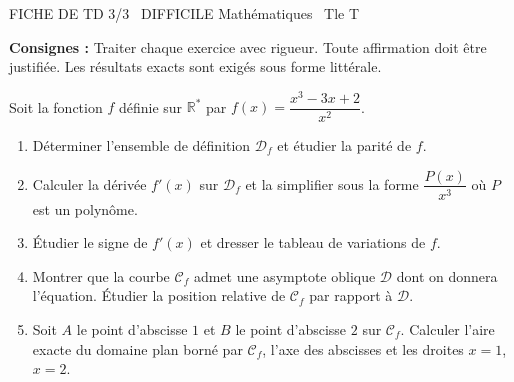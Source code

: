 \documentclass[11pt]{article}
\begin{document}
\begin{tcolorbox}[enhanced,colback=popink,colframe=popink,arc=10pt,boxrule=0pt,left=12pt,right=12pt,top=9pt,bottom=9pt]
{\color{white}\popxbold\small FICHE DE TD 3/3 \textbullet\ DIFFICILE \hfill Mathématiques \textbullet\ Tle T\par}
\end{tcolorbox}
\vspace{4pt}
\noindent\textbf{Consignes :} Traiter chaque exercice avec rigueur. Toute affirmation doit être justifiée. Les résultats exacts sont exigés sous forme littérale.

\begin{exercice}
Soit la fonction $f$ définie sur $\mathbb{R}^*$ par $f(x) = \dfrac{x^3 - 3x + 2}{x^2}$.
\begin{enumerate}
    \item Déterminer l'ensemble de définition $\mathcal{D}_f$ et étudier la parité de $f$.
    \item Calculer la dérivée $f'(x)$ sur $\mathcal{D}_f$ et la simplifier sous la forme $\dfrac{P(x)}{x^3}$ où $P$ est un polynôme.
    \item Étudier le signe de $f'(x)$ et dresser le tableau de variations de $f$.
    \item Montrer que la courbe $\mathcal{C}_f$ admet une asymptote oblique $\mathcal{D}$ dont on donnera l'équation. Étudier la position relative de $\mathcal{C}_f$ par rapport à $\mathcal{D}$.
    \item Soit $A$ le point d'abscisse $1$ et $B$ le point d'abscisse $2$ sur $\mathcal{C}_f$. Calculer l'aire exacte du domaine plan borné par $\mathcal{C}_f$, l'axe des abscisses et les droites $x=1$, $x=2$.
\end{enumerate}
\end{exercice}
\end{document}

